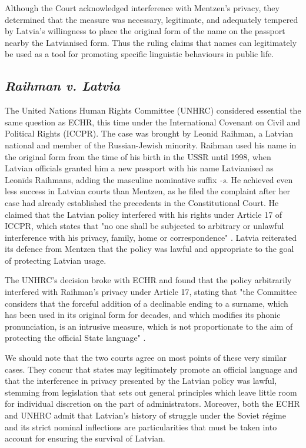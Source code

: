 Although the Court acknowledged interference with Mentzen's privacy, they
determined that the measure was necessary, legitimate, and adequately tempered
by Latvia's willingness to place the original form of the name on the passport
nearby the Latvianised form. Thus the ruling claims that names can legitimately
be used as a tool for promoting specific linguistic behaviours in public life.

\subsection{\textit{Raihman v. Latvia}}

The United Nations Human Rights Committee (UNHRC) considered essential the same
question as ECHR, this time under the International Covenant on Civil and
Political Rights (ICCPR). The case was brought by Leonid Raihman, a Latvian
national and member of the Russian-Jewish minority. Raihman used his name in
the original form from the time of his birth in the USSR until 1998, when
Latvian officials granted him a new passport with his name Latvianised as
Leonīds Raihmans, adding the masculine nominative suffix \textit{-s}. He
achieved even less success in Latvian courts than Mentzen, as he filed the
complaint after her case had already established the precedents in the
Constitutional Court. He claimed that the Latvian policy interfered with his
rights under Article 17 of ICCPR, which states that "no one shall be subjected
to arbitrary or unlawful interference with his privacy, family, home or
correspondence" \parencite{iccpr}. Latvia reiterated its defence from Mentzen
that the policy was lawful and appropriate to the goal of protecting Latvian
usage.

The UNHRC's decision broke with ECHR and found that the policy arbitrarily
interfered with Raihman's privacy under Article 17, stating that "the Committee
considers that the forceful addition of a declinable ending to a surname, which
has been used in its original form for decades, and which modifies its phonic
pronunciation, is an intrusive measure, which is not proportionate to the aim
of protecting the official State language" \parencite[8.3]{raihman10}.

We should note that the two courts agree on most points of these very similar
cases. They concur that states may legitimately promote an official language
and that the interference in privacy presented by the Latvian policy was
lawful, stemming from legislation that sets out general principles which leave
little room for individual discretion on the part of administrators. Moreover,
both the ECHR and UNHRC admit that Latvian's history of struggle under the
Soviet régime and its strict nominal inflections are particularities that must
be taken into account for ensuring the survival of Latvian.

